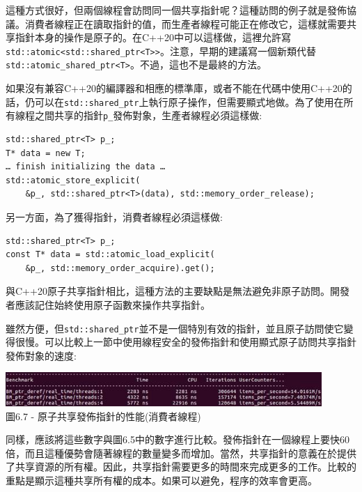 這種方式很好，但兩個線程會訪問同一個共享指針呢？這種訪問的例子就是發佈協議。消費者線程正在讀取指針的值，而生產者線程可能正在修改它，這樣就需要共享指針本身的操作是原子的。在C++20中可以這樣做，這裡允許寫\texttt{std::atomic<std::shared\_ptr<T>>}。注意，早期的建議寫一個新類代替\texttt{std::atomic\_shared\_ptr<T>}。不過，這也不是最終的方法。

如果沒有兼容C++20的編譯器和相應的標準庫，或者不能在代碼中使用C++20的話，仍可以在\texttt{std::shared\_ptr}上執行原子操作，但需要顯式地做。為了使用在所有線程之間共享的指針\texttt{p\_}發佈對象，生產者線程必須這樣做:

\begin{lstlisting}[style=styleCXX]
std::shared_ptr<T> p_;
T* data = new T;
… finish initializing the data …
std::atomic_store_explicit(
	&p_, std::shared_ptr<T>(data), std::memory_order_release);
\end{lstlisting}

另一方面，為了獲得指針，消費者線程必須這樣做:

\begin{lstlisting}[style=styleCXX]
std::shared_ptr<T> p_;
const T* data = std::atomic_load_explicit(
	&p_, std::memory_order_acquire).get();
\end{lstlisting}

與C++20原子共享指針相比，這種方法的主要缺點是無法避免非原子訪問。開發者應該記住始終使用原子函數來操作共享指針。

雖然方便，但\texttt{std::shared\_ptr}並不是一個特別有效的指針，並且原子訪問使它變得很慢。可以比較上一節中使用線程安全的發佈指針和使用顯式原子訪問共享指針發佈對象的速度:

\begin{center}
\includegraphics[width=0.9\textwidth]{content/2/chapter6/images/7.jpg}\\
圖6.7 - 原子共享發佈指針的性能(消費者線程)
\end{center}

同樣，應該將這些數字與圖6.5中的數字進行比較。發佈指針在一個線程上要快60倍，而且這種優勢會隨著線程的數量變多而增加。當然，共享指針的意義在於提供了共享資源的所有權。因此，共享指針需要更多的時間來完成更多的工作。比較的重點是顯示這種共享所有權的成本。如果可以避免，程序的效率會更高。

